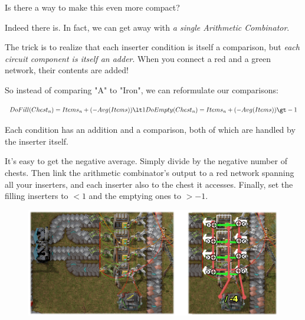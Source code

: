 \documentclass{article}
\begin{document}
Is there a way to make this even more compact?

Indeed there is. In fact, we can get away with \emph{a single Arithmetic Combinator}.

The trick is to realize that each inserter condition is itself a comparison, but \emph{each circuit component is itself an adder}. When you connect a red and a green network, their contents are added!

So instead of comparing "A" to "Iron", we can reformulate our comparisons:

$$
DoFill(Chest_n) = Items_n + (-Avg(Items)) \lt 1\\
DoEmpty(Chest_n) = Items_n + (-Avg(Items)) \gt -1
$$

Each condition has an addition and a comparison, both of which are handled by the inserter itself.

It's easy to get the negative average. Simply divide by the negative number of chests. Then link the
arithmetic combinator's output to a red network spanning all your inserters, and each inserter also to the
chest it accesses. Finally, set the filling inserters to $<1$ and the emptying ones to $>-1$.

\begin{figure}
\includegraphics{balancer.png}
\label{And that's how it works.}
\end{figure}
\end{document}
